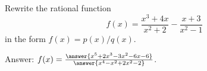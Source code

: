 \documentclass{ximera}
\author{Ivo Terek}
\begin{document}
\begin{exercise}

  Rewrite the rational function $$  f(x) = \frac{x^3+4x}{x^2+2} - \frac{x+3}{x^2-1}  $$in the form $f(x) = p(x)/q(x)$.

  Answer: $f(x) = \frac{\answer{x^5+2x^3-3x^2-6x-6}}{\answer{x^4-x^2+2x^2-2}}$.
\end{exercise}
\end{document}

